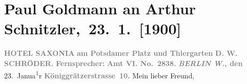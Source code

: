 

         
         \renewcommand{\erwaehntePersonen}{Personen: Richard Beer-Hofmann, Auguste Glümer, Marie Glümer, Paul Goldmann, Eva Marie Goldmann, D. W. Schröder}
         \renewcommand{\erwaehnteOrte}{Orte: Berlin, Florenz, Hotel Saxonia, Passauerstraße, Potsdamer Platz, Stresemannstraße, Tiergarten, Wien}
         \renewcommand{\erwaehnteWerke}{}
               \section[ Paul Goldmann an Arthur Schnitzler, 23. 1. {[}1900{]}]{ Paul Goldmann an Arthur Schnitzler, 23. 1. {[}1900{]}}\nopagebreak{}\rehead{ }\begin{ledgroupsized}[t]{13cm}\normalsize\beginnumbering{} \toendnotes[C]{\smallbreak\pagebreak[2]} 
\toendnotes[C]{\smallbreak}\pstart
           \noindent{}\centering{}{\pb}\textcolor{gray}{\textbf{\textbf{HOTEL SAXONIA}}}\pend
           \pstart
           \noindent{}\raggedleft{}\textcolor{gray}{\textbf{am Potsdamer Platz und
                        Thiergarten}}\pend
           \pstart
           \noindent{}\centering{}\textcolor{gray}{\textbf{D. W. SCHRÖDER.}}\pend
           \pstart
           \noindent{}\textcolor{gray}{\textbf{Fernsprecher:}}\pend
           \pstart
           \textcolor{gray}{\textbf{\textbf{Amt VI. No. 2838.}}}\pend
           \pstart
           \raggedleft{}\textcolor{gray}{\textbf{\emph{BERLIN W.}, den}}{ }23. Janua\substVorne{}\textsuperscript{\textcolor{gray}{\textbf{1}}}\substDazwischen{}r\substHinten{}\pend
           \pstart
           \raggedleft{}\textcolor{gray}{\textbf{Königgrätzerstrasse 10.}}\pend
           \pstart{}Mein lieber Freund,\pend\pstart

\end{ledgroupsized}
